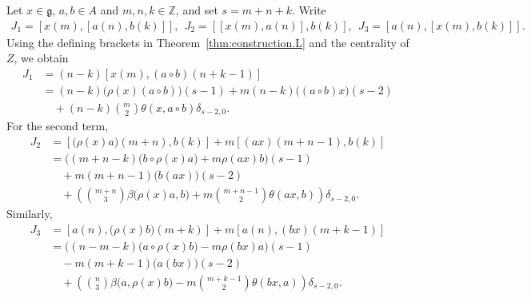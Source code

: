 \documentclass[12pt]{article}
\numberwithin{equation}{section}
\theoremstyle{definition}
\theoremstyle{plain}
\newcommand{\bZ}{\ensuremath{\mathbb{Z}}}
\newcommand{\fg}{\mathfrak{g}}
\begin{document}
Let $x\in\fg$, $a,b\in A$ and $m,n,k\in\bZ$, and set
$s=m+n+k$. Write
\begin{align*}
    J_1=[x(m),[a(n),b(k)]],\ \ J_2=[[x(m),a(n)],b(k)],\ 
    \ J_3=[a(n),[x(m),b(k)]].
\end{align*}
Using the defining brackets in Theorem~\ref{thm:construction.L} and the centrality of $Z$, we obtain
\begin{align*}
    J_1&=(n-k)[x(m),(a\circ b)(n+k-1)]\\
    &=(n-k)\big(\rho(x)(a\circ b)\big)(s-1)+m(n-k)\big((a\circ b)x\big)(s-2)\\
    &\quad+(n-k)\binom{m}{2}\theta(x,a\circ b)\delta_{s-2,0}.
\end{align*}
For the second term,
\begin{align*}
    J_2&=[\big(\rho(x)a\big)(m+n),b(k)]+m[(ax)(m+n-1),b(k)]\\
    &=\big((m+n-k)\big(b\circ\rho(x)a\big)+m\rho(ax)b\big)(s-1)\\
    &\quad+m(m+n-1)\big(b(ax)\big)(s-2)\\
    &\quad+\left(\binom{m+n}{3}\beta\big(\rho(x)a,b\big)+m\binom{m+n-1}{2}\theta(ax,b)\right)\delta_{s-2,0}.
\end{align*}
Similarly,
\begin{align*}
    J_3&=[a(n),\big(\rho(x)b\big)(m+k)]+m[a(n),(bx)(m+k-1)]\\
    &=\big((n-m-k)\big(a\circ\rho(x)b\big)-m\rho(bx)a\big)(s-1)\\
    &\quad-m(m+k-1)\big(a(bx)\big)(s-2)\\
    &\quad+\left(\binom{n}{3}\beta\big(a,\rho(x)b\big)-m\binom{m+k-1}{2}\theta(bx,a)\right)\delta_{s-2,0}.
\end{align*}
\end{document}
